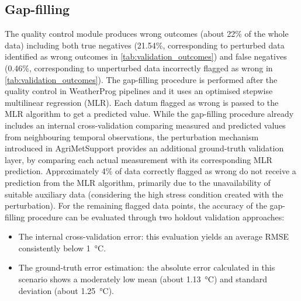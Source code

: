 \documentclass[authoryear,preprint,review,12pt]{elsarticle}
\newcommand{\statusblock}[3]{
    \ifthenelse{\equal{#2}{todo}}
        {\textcolor{red}{#1 (TO DO): #3}}
        {}
    \ifthenelse{\equal{#2}{wip}}
        {\textcolor{magenta}{#1 (IN PROGRESS): #3}}
        {}
    \ifthenelse{\equal{#2}{update}}
        {\textcolor{blue}{#1 (UPDATE): #3}}
        {}
    \ifthenelse{\equal{#2}{review}}
        {\textcolor{cyan}{#1 (REVIEW): #3}}
        {}
    \ifthenelse{\equal{#2}{done}}
        {\textcolor{PineGreen}{#1 (READY): #3}}
        {}
}
\begin{document}


\subsection{Gap-filling}
The quality control module produces wrong outcomes (about 22\% of the whole data) including both true negatives (21.54\%, corresponding to perturbed data identified as wrong outcomes in \cref{tab:validation_outcomes}) and false negatives (0.46\%, corresponding to unperturbed data incorrectly flagged as wrong in \cref{tab:validation_outcomes}).
The gap-filling procedure is performed after the quality control in WeatherProg pipelines and it uses an optimised stepwise multilinear regression (MLR).
Each datum flagged as wrong is passed to the MLR algorithm to get a predicted value.
While the gap-filling procedure already includes an internal cross-validation comparing measured and predicted values from neighbouring temporal observations, the perturbation mechanism introduced in AgriMetSupport provides an additional ground-truth validation layer, 
by comparing each actual measurement with its corresponding MLR prediction. %
Approximately 4\% of data correctly flagged as wrong do not receive a prediction from the MLR algorithm, primarily due to the unavailability of suitable auxiliary data (considering the high stress condition created with the perturbation).
For the remaining flagged data points, the accuracy of the gap-filling procedure can be evaluated through two holdout validation approaches:
\begin{itemize}
    \item The internal cross-validation error: this evaluation yields an average RMSE consistently below \SI{1}{\degreeCelsius}. %
    \item The ground-truth error estimation: the absolute error calculated in this scenario shows a moderately low mean (about \SI{1.13}{\degreeCelsius}) and standard deviation (about \SI{1.25}{\degreeCelsius}). %
\end{itemize}
\end{document}
